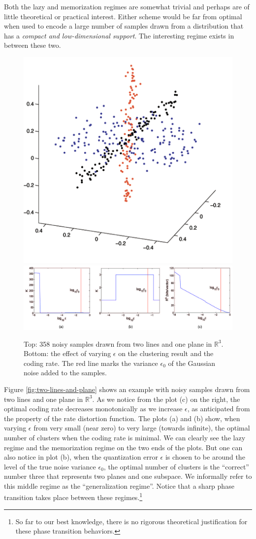\documentclass[../../book-main.tex]{subfiles}
\begin{document}
Both the lazy and memorization regimes are somewhat trivial and perhaps are of little theoretical or practical interest. Either scheme would be far from optimal when used to encode a large number of samples drawn from a distribution that has a {\em compact and low-dimensional support}. The interesting regime exists in between these two.
\begin{example}
	\begin{figure}[t]
		\centering
		\includegraphics[width=0.4\linewidth]{chapters/chapter3/figs/Two-lines-and-plane.png}
		\includegraphics[width=0.9\linewidth]{chapters/chapter3/figs/Coding-Rate.jpg}
		\caption{Top: 358  noisy samples drawn from two lines and one plane in $\mathbb{R}^3$. Bottom: the effect of varying $\epsilon$ on the clustering result and the coding rate. The red line marks the variance $\epsilon_0$ of the Gaussian noise added to the samples.}
		\label{fig:two-lines-and-plane}
		\label{fig:two-lines-and-plane-epsilon}
	\end{figure}
	Figure \ref{fig:two-lines-and-plane}  shows an example with noisy samples drawn from two lines and one plane in $\mathbb{R}^3$. As we notice from the plot (c) on the right, the optimal coding rate decreases monotonically as we increase $\epsilon$, as anticipated from the property of the rate distortion function. The plots (a) and (b) show, when varying $\epsilon$ from very small (near zero) to very large (towards infinite), the optimal number of clusters when the coding rate is minimal. We can clearly see the lazy regime and the memorization regime on the two ends of the plots. But one can also notice in plot (b), when the quantization error $\epsilon$ is chosen to be around the level of the true noise variance $\epsilon_0$, the optimal number of clusters is the ``correct'' number three that represents two planes and one subspace.  We informally refer to this middle regime as the ``generalization regime''. Notice that a sharp phase transition takes place between these regimes.\footnote{So far to our best knowledge, there is no rigorous theoretical justification for these phase transition behaviors.}
\end{example}
\end{document}
